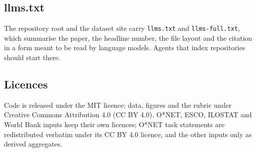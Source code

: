 \subsection{llms.txt}

The repository root and the dataset site carry \texttt{llms.txt} and \texttt{llms-full.txt}, which summarise the paper, the headline number, the file layout and the citation in a form meant to be read by language models.
Agents that index repositories should start there.

\subsection{Licences}

Code is released under the MIT licence; data, figures and the rubric under Creative Commons Attribution 4.0 (CC BY 4.0).
O*NET, ESCO, ILOSTAT and World Bank inputs keep their own licences; O*NET task statements are redistributed verbatim under its CC BY 4.0 licence, and the other inputs only as derived aggregates.
